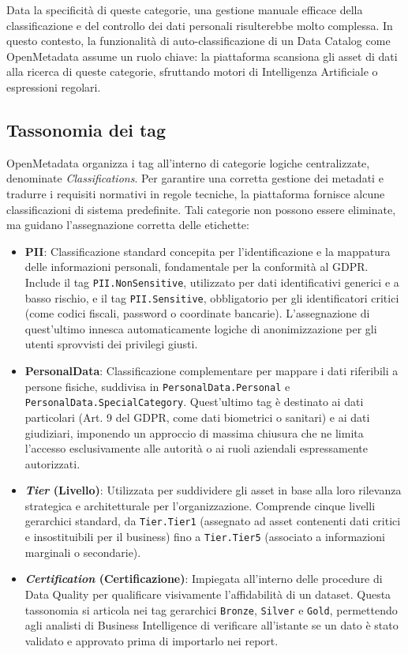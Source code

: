 \noindent Data la specificità di queste categorie, una gestione manuale efficace della classificazione e del controllo dei dati personali risulterebbe molto complessa. 
In questo contesto, la funzionalità di auto-classificazione di un Data Catalog come OpenMetadata assume un ruolo chiave: la piattaforma scansiona gli asset di dati 
alla ricerca di queste categorie, sfruttando motori di Intelligenza Artificiale o espressioni regolari.

\subsection{Tassonomia dei tag}
OpenMetadata organizza i tag all'interno di categorie logiche centralizzate, denominate \emph{Classifications}. Per garantire una corretta gestione dei 
metadati e tradurre i requisiti normativi in regole tecniche, la piattaforma fornisce alcune classificazioni di sistema predefinite. Tali categorie non possono essere 
eliminate, ma guidano l'assegnazione corretta delle etichette:
\begin{itemize}
    \item \textbf{PII}: Classificazione standard concepita per l'identificazione e la mappatura delle informazioni personali, fondamentale per la conformità al GDPR. Include il tag \texttt{PII.NonSensitive}, utilizzato per dati identificativi generici e a basso rischio, e il tag \texttt{PII.Sensitive}, obbligatorio per gli identificatori critici (come codici fiscali, password o coordinate bancarie). L'assegnazione di quest'ultimo innesca automaticamente logiche di anonimizzazione per gli utenti sprovvisti dei privilegi giusti.
    \item \textbf{PersonalData}: Classificazione complementare per mappare i dati riferibili a persone fisiche, suddivisa in \texttt{PersonalData.Personal} e \texttt{PersonalData.SpecialCategory}. Quest'ultimo tag è destinato ai dati particolari (Art. 9 del GDPR, come dati biometrici o sanitari) e ai dati giudiziari, imponendo un approccio di massima chiusura che ne limita l'accesso esclusivamente alle autorità o ai ruoli aziendali espressamente autorizzati.
    \item \textbf{\emph{Tier} (Livello)}: Utilizzata per suddividere gli asset in base alla loro rilevanza strategica e architetturale per l'organizzazione. Comprende cinque livelli gerarchici standard, da \texttt{Tier.Tier1} (assegnato ad asset contenenti dati critici e insostituibili per il business) fino a \texttt{Tier.Tier5} (associato a informazioni marginali o secondarie).
    \item \textbf{\emph{Certification} (Certificazione)}: Impiegata all'interno delle procedure di Data Quality per qualificare visivamente l'affidabilità di un dataset. Questa tassonomia si articola nei tag gerarchici \texttt{Bronze}, \texttt{Silver} e \texttt{Gold}, permettendo agli analisti di Business Intelligence di verificare all'istante se un dato è stato validato e approvato prima di importarlo nei report.
\end{itemize}

